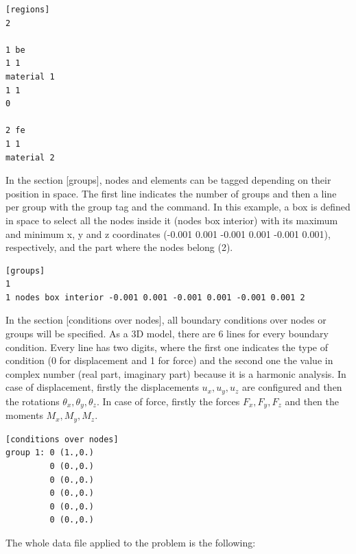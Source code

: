 \documentclass[a4]{article}
\begin{document}
\begin{Verbatim}	
[regions]
2

1 be
1 1
material 1
1 1
0

2 fe
1 1
material 2
\end{Verbatim}

In the section [groups], nodes and elements can be tagged depending on their position in space. The first line indicates the number of groups and then a line per group with the group tag and the command. In this example, a box is defined in space to select all the nodes inside it (nodes box interior) with its maximum and minimum x, y and z coordinates (-0.001 0.001 -0.001 0.001 -0.001 0.001), respectively, and the part where the nodes belong (2).    

\begin{Verbatim}
[groups]
1
1 nodes box interior -0.001 0.001 -0.001 0.001 -0.001 0.001 2 
\end{Verbatim}

In the section [conditions over nodes], all boundary conditions over nodes or groups will be specified. As a 3D model, there are 6 lines for every boundary condition. Every line has two digits, where the first one indicates the type of condition (0 for displacement and 1 for force) and the second one the value in complex number (real part, imaginary part) because it is a harmonic analysis. In case of displacement, firstly the displacements $u_x, u_y, u_z$ are configured and then the rotations $\theta_x, \theta_y, \theta_z$. In case of force, firstly the forces $F_x, F_y, F_z$ and then the moments $M_x, M_y, M_z$. 

\begin{Verbatim}	
[conditions over nodes]
group 1: 0 (1.,0.)
         0 (0.,0.)
         0 (0.,0.)
         0 (0.,0.)
         0 (0.,0.)
         0 (0.,0.)
\end{Verbatim}

The whole data file applied to the problem is the following:
\end{document}
